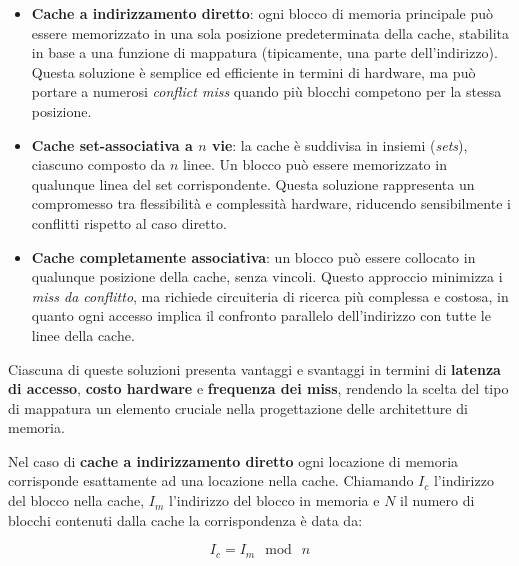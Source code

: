 \begin{itemize}
  \item \textbf{Cache a indirizzamento diretto}: ogni blocco di memoria principale può essere memorizzato in una sola posizione predeterminata della cache, stabilita in base a una funzione di mappatura (tipicamente, una parte dell'indirizzo). Questa soluzione è semplice ed efficiente in termini di hardware, ma può portare a numerosi \textit{conflict miss} quando più blocchi competono per la stessa posizione.
  
  \item \textbf{Cache set-associativa a $n$ vie}: la cache è suddivisa in insiemi (\textit{sets}), ciascuno composto da $n$ linee. Un blocco può essere memorizzato in qualunque linea del set corrispondente. Questa soluzione rappresenta un compromesso tra flessibilità e complessità hardware, riducendo sensibilmente i conflitti rispetto al caso diretto.
  
  \item \textbf{Cache completamente associativa}: un blocco può essere collocato in qualunque posizione della cache, senza vincoli. Questo approccio minimizza i \textit{miss da conflitto}, ma richiede circuiteria di ricerca più complessa e costosa, in quanto ogni accesso implica il confronto parallelo dell'indirizzo con tutte le linee della cache.
\end{itemize}
\noindent
Ciascuna di queste soluzioni presenta vantaggi e svantaggi in termini di \textbf{latenza di accesso}, \textbf{costo hardware} e \textbf{frequenza dei miss}, rendendo la scelta del tipo di mappatura un elemento cruciale nella progettazione delle architetture di memoria.


\noindent Nel caso di \textbf{cache a indirizzamento diretto} ogni locazione di memoria corrisponde esattamente ad una locazione nella cache. Chiamando $I_c$ l'indirizzo del blocco nella cache, $I_m$ l'indirizzo del blocco in memoria e $N$ il numero di blocchi contenuti dalla cache la corrispondenza è data da:

\begin{equation}
    I_c = I_m \ \bmod \ n 
\end{equation}


